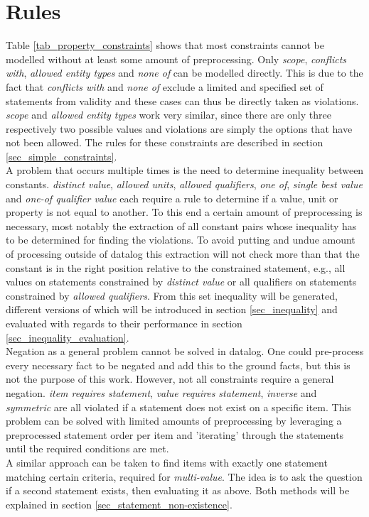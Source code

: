 \documentclass[hyperref,bachelorofscience,fleqn]{cgvpub}
\begin{document}
\section{Rules}
Table \ref{tab_property_constraints} shows that most constraints cannot be modelled without at least some amount of preprocessing. Only \emph{scope}, \emph{conflicts with}, \emph{allowed entity types} and \emph{none of} can be modelled directly. This is due to the fact that \emph{conflicts with} and \emph{none of} exclude a limited and specified set of statements from validity and these cases can thus be directly taken as violations. \emph{scope} and \emph{allowed entity types} work very similar, since there are only three respectively two possible values and violations are simply the options that have not been allowed. The rules for these constraints are described in section \ref{sec_simple_constraints}.\\

A problem that occurs multiple times is the need to determine inequality between constants. \emph{distinct value}, \emph{allowed units}, \emph{allowed qualifiers}, \emph{one of}, \emph{single best value} and \emph{one-of qualifier value} each require a rule to determine if a value, unit or property is not equal to another. To this end a certain amount of preprocessing is necessary, most notably the extraction of all constant pairs whose inequality has to be determined for finding the violations. To avoid putting and undue amount of processing outside of datalog this extraction will not check more than that the constant is in the right position relative to the constrained statement, e.g., all values on statements constrained by \emph{distinct value} or all qualifiers on statements constrained by \emph{allowed qualifiers}. From this set inequality will be generated, different versions of which will be introduced in section \ref{sec_inequality} and evaluated with regards to their performance in section \ref{sec_inequality_evaluation}.\\

Negation as a general problem cannot be solved in datalog. One could pre-process every necessary fact to be negated and add this to the ground facts, but this is not the purpose of this work. However, not all constraints require a general negation. \emph{item requires statement}, \emph{value requires statement}, \emph{inverse }and \emph{symmetric} are all violated if a statement does not exist on a specific item. This problem can be solved with limited amounts of preprocessing by leveraging a preprocessed statement order per item and 'iterating' through the statements until the required conditions are met.\\
A similar approach can be taken to find items with exactly one statement matching certain criteria, required for 	\emph{multi-value}. The idea is to ask the question if a second statement exists, then evaluating it as above. Both methods will be explained in section \ref{sec_statement_non-existence}.
\end{document}
